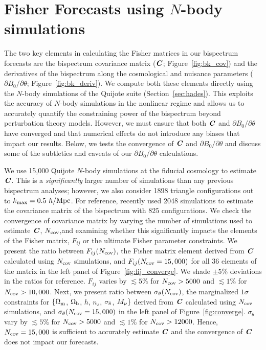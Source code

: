 \section{Fisher Forecasts using $N$-body simulations} \label{sec:numerical}
The two key elements in calculating the Fisher matrices in our bispectrum forecasts
are the bispectrum covariance matrix ($\textbf{\textit{C}}$; Figure~\ref{fig:bk_cov}) and 
the derivatives of the bispectrum along the cosmological and nuisance parameters 
($\partial B_0/\partial \theta$; Figure~\ref{fig:bk_deriv}). We compute 
both these elements directly using the $N$-body simulations of the Quijote suite 
(Section~\ref{sec:hades}). This exploits the accuracy of $N$-body simulations in 
the nonlinear regime and allows us to accurately quantify the constraining power of 
the bispectrum beyond perturbation theory models. However, we must ensure that 
both $\textbf{\textit{C}}$ and $\partial B_0/\partial \theta$ have converged and that numerical 
effects do not introduce any biases that impact our results. Below, we tests 
the convergence of $\textbf{\textit{C}}$ and $\partial B_0/\partial \theta$ and discuss
some of the subtleties and caveats of our $\partial B_0/\partial \theta$ 
calculations. 

We use 15,000 Quijote $N$-body simulations at the fiducial cosmology to 
estimate $\textbf{\textit{C}}$. This is a \emph{significantly} larger number of simulations 
than any previous bispectrum analyses; however, we also consider 1898 triangle 
configurations out to $k_{\rm max} = 0.5~h/{\rm Mpc}$. For reference, \cite{gil-marin2017} 
recently used 2048 simulations to estimate the covariance matrix of the 
bispectrum with $825$ configurations. We check the convergence of covariance 
matrix by varying the number of simulations used to estimate $\textbf{\textit{C}}$, 
$N_{\rm cov}$,and examining whether this significantly impacts the elements of 
the Fisher matrix, $F_{ij}$ or the ultimate Fisher parameter constraints. 
We present the ratio between $F_{ij}(N_{\rm cov})$, the Fisher matrix element 
derived from $\textbf{\textit{C}}$ calculated using $N_{\rm cov}$ simulations, and 
$F_{ij}(N_{\rm cov} = 15,000)$ for all 36 elements of the matrix in 
the left panel of Figure~\ref{fig:fij_converge}. We shade $\pm5\%$ deviations 
in the ratios for reference. $F_{ij}$ varies by $\lesssim 5\%$ for $N_{\rm cov} > 5000$
and $\lesssim 1\%$ for $N_{\rm cov} > 10,000$. Next, we present ratio between 
$\sigma_\theta(N_{\rm cov})$, the marginalized $1\sigma$ constraints for 
$\{\Omega_{\rm m}$, $\Omega_{\rm b}$, $h$, $n_s$, $\sigma_8$, $M_\nu\}$ derived from $\textbf{\textit{C}}$ 
calculated using $N_{\rm cov}$ simulations, and $\sigma_\theta(N_{\rm cov} = 15,000)$ 
in the left panel of Figure~\ref{fig:converge}. $\sigma_\theta$ vary by 
$\lesssim 5\%$ for $N_{\rm cov} > 5000$ and $\lesssim 1\%$ for $N_{\rm cov} > 12000$. 
Hence, $N_{\rm cov} = 15,000$ is sufficient to accurately estimate $\textbf{\textit{C}}$
and the convergence of $\textbf{\textit{C}}$ does not impact our forecasts.

